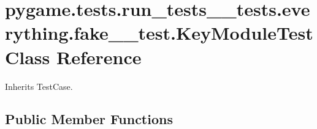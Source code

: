 \hypertarget{classpygame_1_1tests_1_1run__tests____tests_1_1everything_1_1fake__2__test_1_1_key_module_test}{}\section{pygame.\+tests.\+run\+\_\+tests\+\_\+\+\_\+tests.\+everything.\+fake\+\_\+\_\+test.\+Key\+Module\+Test Class Reference}
\label{classpygame_1_1tests_1_1run__tests____tests_1_1everything_1_1fake__2__test_1_1_key_module_test}


Inherits Test\+Case.

\subsection*{Public Member Functions}

